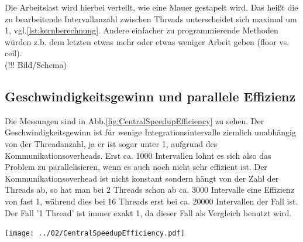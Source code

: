 \documentclass[12pt,a4paper]{article}
\begin{document}
Die Arbeitslast wird hierbei verteilt, wie eine Mauer gestapelt wird. Das heißt die zu bearbeitende Intervallanzahl zwischen Threads unterscheidet sich maximal um 1, vgl.\ref{lst:kernberechnung}. Andere einfacher zu programmierende Methoden würden z.b. dem letzten etwas mehr oder etwas weniger Arbeit geben (floor vs. ceil).\\
(!!! Bild/Schema)\\


\subsection{Geschwindigkeitsgewinn und parallele Effizienz}

Die Messungen sind in Abb.\ref{fig:CentralSpeedupEfficiency} zu sehen. Der Geschwindigkeitsgewinn ist für wenige Integrationsintervalle ziemlich unabhängig von der Threadanzahl, ja er ist sogar unter 1, aufgrund des Kommunikationsoverheads. Erst ca. 1000 Intervallen lohnt es sich also das Problem zu parallelisieren, wenn es auch noch nicht sehr effizient ist. Der Kommunikationsoverhead ist nicht konstant sondern hängt von der Zahl der Threads ab, so hat man bei 2 Threads schon ab ca. 3000 Intervalle eine Effizienz von fast 1, während dies bei 16 Threads erst bei ca. 20000 Intervallen der Fall ist. Der Fall '1 Thread' ist immer exakt 1, da dieser Fall als Vergleich benutzt wird.\\

\begin{center}
	\captionsetup{type=figure}
	\centering
	\begin{minipage}{\linewidth}
		\texttt{[image: ../02/CentralSpeedupEfficiency.pdf]}
	\end{minipage}
	\label{fig:CentralSpeedupEfficiency}
\end{center}
\end{document}
